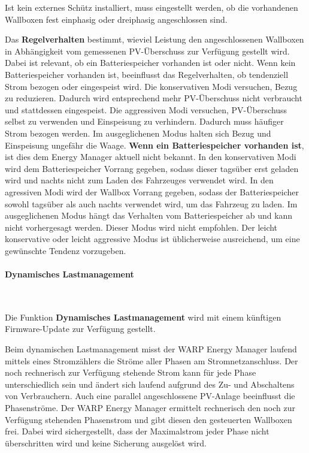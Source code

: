 \documentclass[a4paper,10pt]{article}
\newcommand{\hint}[1]{\begin{tcolorbox}[colback=boxgray,colframe=black,coltext=
white,title=Hinweis,left*=2mm,right*=2mm,boxsep=1mm,bottom=1mm,top=1mm]#1\end{tcolorbox}}
\begin{document}
\begin{multicols*}{2}
	Ist kein externes Schütz installiert, muss eingestellt werden, ob die
	vorhandenen Wallboxen fest einphasig oder dreiphasig angeschlossen sind.

	Das \textbf{Regelverhalten} bestimmt, wieviel Leistung den an­ge­schlos­senen Wallboxen in Abhängigkeit vom ge­messen­en PV-Über­schuss zur Verfügung gestellt wird. Dabei ist relevant, ob ein Batteriespeicher vorhanden ist oder nicht. Wenn kein Batteriespeicher vorhanden ist, beeinflusst das Regelverhalten, ob tendenziell Strom bezogen oder eingespeist wird. Die konservativen Modi versuchen, Bezug zu reduzieren. Dadurch wird entsprechend mehr PV-Über­schuss nicht verbraucht und stattdessen eingespeist. Die aggressiven Modi versuchen, PV-Über­schuss selbst zu verwenden und Einspeisung zu verhindern. Dadurch muss häufiger Strom bezogen werden. Im ausgeglichenen Modus halten sich Bezug und Einspeisung ungefähr die Waage. \textbf{Wenn ein Batteriespeicher vorhanden ist}, ist dies dem Energy Manager aktuell nicht bekannt. In den konservativen Modi wird dem Batteriespeicher Vorrang gegeben, sodass dieser tagsüber erst geladen wird und nachts nicht zum Laden des Fahr­zeuges verwendet wird. In den agressiven Modi wird der Wallbox Vorrang gegeben, sodass der Batteriespeicher sowohl tagsüber als auch nachts verwendet wird, um das Fahrzeug zu laden. Im ausgeglichenen Modus hängt das Verhalten vom Batteriespeicher ab und kann nicht vorhergesagt werden. Dieser Modus wird nicht empfohlen. Der leicht konservative oder leicht aggressive Modus ist üb­licher­weise aus­reich­end, um eine gewünschte Tendenz vorzugeben.

	\paragraph{Dynamisches Lastmanagement}\ \\
	\hint{Die Funktion \textbf{Dynamisches Lastmanagement} wird mit einem künftigen Firmware-Update zur Verfügung gestellt.}

	Beim dynamischen Lastmanagement misst der WARP Energy Manager laufend mittels eines Stromzählers die
	Ströme aller Phasen am Stromnetzanschluss. Der noch rechnerisch zur
	Verfügung stehende Strom kann für jede Phase unterschiedlich sein und ändert
	sich laufend aufgrund des Zu- und Abschaltens von Verbrauchern. Auch eine
	parallel angeschlossene PV-Anlage beeinflusst die Phasenströme. Der WARP
	Energy Manager ermittelt rechnerisch den noch zur Verfügung stehenden
	Phasenstrom und gibt diesen den gesteuerten Wallboxen frei.
	Dabei wird sichergestellt, dass der Maximalstrom jeder Phase nicht überschritten wird und keine Sicherung ausgelöst wird.


\end{multicols*}
\end{document}
